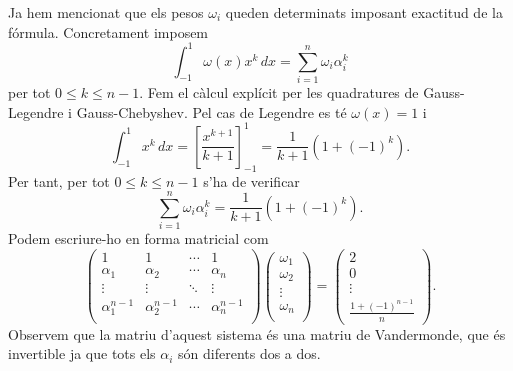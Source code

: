 \documentclass[12pt]{article}
\numberwithin{table}{section}
\numberwithin{figure}{section}
\numberwithin{equation}{section}
\begin{document}
Ja hem mencionat que els pesos \( \omega_i \) queden determinats imposant exactitud de la fórmula. Concretament imposem
\begin{equation*}
	\int_{-1}^{1}\omega(x) x^k \,dx = \sum_{i = 1}^n \omega_i \alpha_i^k
\end{equation*}
per tot \( 0 \leq k \leq n-1 \). Fem el càlcul explícit per les quadratures de Gauss-Legendre i Gauss-Chebyshev. Pel cas de Legendre es té \( \omega(x) = 1 \) i 
\begin{equation*}
	\int_{-1}^{1}x^k\,dx = \left[\frac{x^{k+1}}{k+1}\right]^{1}_{-1} = \frac{1}{k+1}\left(1 + (-1)^k\right). 
\end{equation*}
Per tant, per tot \( 0 \leq k \leq n-1 \) s'ha de verificar 
\begin{equation*}
	\sum_{i = 1}^n \omega_i \alpha_i^k = \frac{1}{k+1}\left(1 + (-1)^k\right). 
\end{equation*}
Podem escriure-ho en forma matricial com
\begin{equation}\label{eq:pesos legendre}
	\begin{pmatrix}
		1 & 1 & \cdots & 1 \\
		\alpha_1 & \alpha_2 & \cdots & \alpha_n \\
		\vdots & \vdots & \ddots & \vdots \\
		\alpha_1^{n-1} & \alpha_2^{n-1} & \cdots & \alpha_n^{n-1} \\
	\end{pmatrix}
	\begin{pmatrix}
		\omega_1 \\
		\omega_2 \\
		\vdots \\
		\omega_n \\
	\end{pmatrix}
	=
	\begin{pmatrix}
		2 \\
		0 \\
		\vdots \\
		\frac{1 + (-1)^{n-1}}{n}
	\end{pmatrix}.
\end{equation}
Observem que la matriu d'aquest sistema és una matriu de Vandermonde, que és invertible ja que tots els \( \alpha_i \) són diferents dos a dos.  
\end{document}
